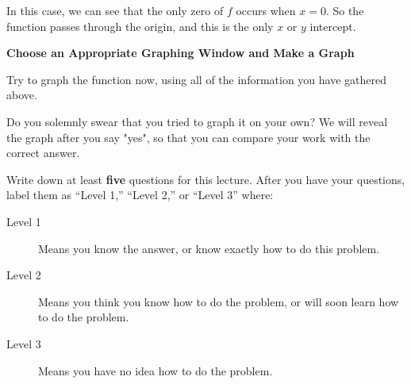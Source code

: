 \documentclass{ximera}
\begin{document}
\begin{question}
  In this case, we can see that the only zero of $f$ occurs when $x=0$.  So the function passes through the origin, and this is the only $x$ or $y$ intercept.
  
  \textbf{Choose an Appropriate Graphing Window and Make a Graph}
  
  Try to graph the function now, using all of the information you have gathered above.  
  
  
  \begin{solution}
  
  Do you solemnly swear that you tried to graph it on your own?  We will reveal the graph after you say "yes", so that you can compare your work with the correct answer.
  
  	\begin{multipleChoice}
    \end{multipleChoice}

  \end{solution}
  
       
\begin{image}
\end{image}


  
\end{question}

Write down at least \textbf{five} questions for this lecture. After
you have your questions, label them as ``Level 1,'' ``Level 2,'' or ``Level 3'' where:
\begin{description}
\item[Level 1] Means you know the answer, or know exactly how to do this problem.
\item[Level 2] Means you think you know how to do the problem, or will soon learn how to do the problem.
\item[Level 3] Means you have no idea how to do the problem. 
\end{description}
\begin{question}
  \begin{freeResponse}
  \end{freeResponse}
\end{question}
\end{document}
